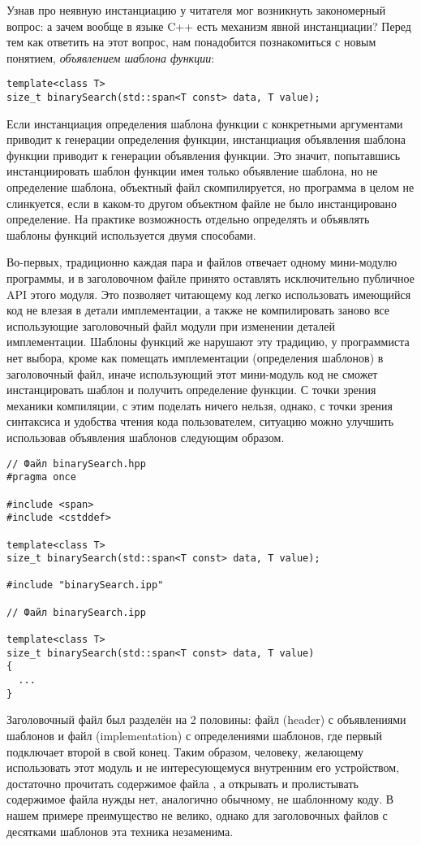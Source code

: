 Узнав про неявную инстанциацию у читателя мог возникнуть закономерный вопрос: а зачем вообще в языке C++ есть механизм явной инстанциации? Перед тем как ответить на этот вопрос, нам понадобится познакомиться с новым понятием, \textit{объявлением шаблона функции}:
\begin{verbatim}
template<class T>
size_t binarySearch(std::span<T const> data, T value);
\end{verbatim}
Если инстанциация определения шаблона функции с конкретными аргументами приводит к генерации определения функции, инстанциация объявления шаблона функции приводит к генерации объявления функции.
Это значит, попытавшись инстанциировать шаблон функции имея только объявление шаблона, но не определение шаблона, объектный файл скомпилируется, но программа в целом не слинкуется, если в каком-то другом объектном файле не было инстанцировано определение.
На практике возможность отдельно определять и объявлять шаблоны функций используется двумя способами.

Во-первых, традиционно каждая пара  и  файлов отвечает одному мини-модулю программы, и в заголовочном файле принято оставлять исключительно публичное API этого модуля.
Это позволяет читающему код легко использовать имеющийся код не влезая в детали имплементации, а также не компилировать заново все использующие заголовочный файл модули при изменении деталей имплементации.
Шаблоны функций же нарушают эту традицию, у программиста нет выбора, кроме как помещать имплементации (определения шаблонов) в заголовочный файл, иначе использующий этот мини-модуль код не сможет инстанцировать шаблон и получить определение функции.
С точки зрения механики компиляции, с этим поделать ничего нельзя, однако, с точки зрения синтаксиса и удобства чтения кода пользователем, ситуацию можно улучшить использовав объявления шаблонов следующим образом.
\begin{verbatim}
// Файл binarySearch.hpp
#pragma once

#include <span>
#include <cstddef>

template<class T>
size_t binarySearch(std::span<T const> data, T value);

#include "binarySearch.ipp"

// Файл binarySearch.ipp

template<class T>
size_t binarySearch(std::span<T const> data, T value)
{
  ...
}
\end{verbatim}
Заголовочный файл был разделён на 2 половины: файл  (header) с объявлениями шаблонов и файл  (implementation) с определениями шаблонов, где первый подключает второй в свой конец.
Таким образом, человеку, желающему использовать этот модуль и не интересующемуся внутренним его устройством, достаточно прочитать содержимое файла , а открывать и пролистывать содержимое файла  нужды нет, аналогично обычному, не шаблонному коду.
В нашем примере преимущество не велико, однако для заголовочных файлов с десятками шаблонов эта техника незаменима.


